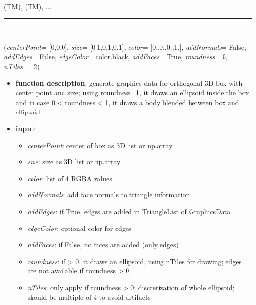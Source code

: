\begin{itemize}[leftmargin=1.4cm]
\begin{itemize}[leftmargin=1.4cm]
\begin{itemize}[leftmargin=1.4cm]
\begin{itemize}[leftmargin=0.5cm]
\begin{itemize}[leftmargin=1.4cm]
\begin{itemize}[leftmargin=1.4cm]
\begin{itemize}[leftmargin=1.4cm]
\begin{itemize}[leftmargin=0.5cm]
\begin{itemize}[leftmargin=1.4cm]
\\  (TM), 
 (TM), 
 ...

\ei

%
\noindent\rule{8cm}{0.75pt}\vspace{1pt} \\ 
\begin{flushleft}
\label{sec:graphics:Brick}
({\it centerPoint}= [0,0,0], {\it size}= [0.1,0.1,0.1], {\it color}= [0.,0.,0.,1.], {\it addNormals}= False, {\it addEdges}= False, {\it edgeColor}= color.black, {\it addFaces}= True, {\it roundness}= 0, {\it nTiles}= 12)
\end{flushleft}
\setlength{\itemindent}{0.7cm}
\begin{itemize}[leftmargin=0.7cm]
\item[--]
{\bf function description}: generate graphics data for orthogonal 3D box with center point and size; using roundness=1, it draws an ellipsoid inside the box and in case 0 < roundness < 1, it draws a body blended between box and ellipsoid
\item[--]
{\bf input}: \vspace{-6pt}
\begin{itemize}[leftmargin=1.2cm]
\setlength{\itemindent}{-0.7cm}
\item[]{\it centerPoint}: center of box as 3D list or np.array
\item[]{\it size}: size as 3D list or np.array
\item[]{\it color}: list of 4 RGBA values
\item[]{\it addNormals}: add face normals to triangle information
\item[]{\it addEdges}: if True, edges are added in TriangleList of GraphicsData
\item[]{\it edgeColor}: optional color for edges
\item[]{\it addFaces}: if False, no faces are added (only edges)
\item[]{\it roundness}: if > 0, it draws an ellipsoid, using nTiles for drawing; edges are not available if roundness > 0
\item[]{\it nTiles}: only apply if roundness > 0; discretization of whole ellipsoid; should be multiple of 4 to avoid artifacts

\end{itemize}
\end{itemize}
\end{itemize}
\end{itemize}
\end{itemize}
\end{itemize}
\end{itemize}
\end{itemize}
\end{itemize}
\end{itemize}
\end{itemize}
